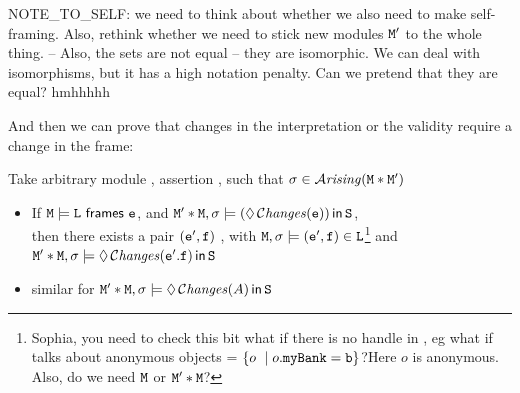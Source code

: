 NOTE\_TO\_SELF: we need to think about whether we also need to make  self-framing.
Also, rethink whether we need to stick new modules ${\mbox{\tt{M}}}'$ to the whole thing.
--
Also, the sets are not equal -- they are isomorphic. We can deal with isomorphisms, but
it has a high notation penalty. Can we pretend that they are equal? hmhhhhh


And then we can prove that changes in the interpretation or the validity require a change in the frame:

\begin{lemma}
Take arbitrary module \M, assertion \A, such that  $\sigma\in{\mathcal{A}}\textrm{\textit{rising}}({{\mbox{\tt{M}}}*{\mbox{\tt{M}}}'})$

\begin{itemize}
\item
If  ${\mbox{\tt{M}}}  \models {\mbox{\tt{L}}} ~{\bf{\sf {frames}}}~ {\mbox{\tt{e}}}$, and
${\mbox{\tt{M}}}'*{\mbox{\tt{M}}}, \sigma \models (\lozenge\, \mathcal{C}\textrm{\textit{hanges}}({\mbox{\tt{e}}}))\,{\bf{\sf {in}}}\, {\mbox{\tt{S}}}$, \\
then there exists a pair $({\mbox{\tt{e}}}',{\mbox{\tt{f}}})$ , with
${\mbox{\tt{M}}},\sigma \models ({\mbox{\tt{e}}}',{\mbox{\tt{f}}})\in {\mbox{\tt{L}}}$\footnote{Sophia, you need to check this bit  what if 
there is no handle in , eg what if  talks about anonymous objects
\eg {} = $\{ o \ \mid o.{\mbox{\tt{myBank}}}={\mbox{\tt{b}}} \}$?Here $o$ is anonymous. Also, do we need ${\mbox{\tt{M}}}$ or ${\mbox{\tt{M}}}'*{\mbox{\tt{M}}}$?}
and ${\mbox{\tt{M}}}'*{\mbox{\tt{M}}}, \sigma \models  \lozenge\, \mathcal{C}\textrm{\textit{hanges}}({\mbox{\tt{e}}}'.{\mbox{\tt{f}}})\,{\bf{\sf {in}}}\, {\mbox{\tt{S}}}$

\item
similar for
${\mbox{\tt{M}}}'*{\mbox{\tt{M}}}, \sigma \models \lozenge\, \mathcal{C}\textrm{\textit{hanges}}(A)\,{\bf{\sf {in}}}\, {\mbox{\tt{S}}}$
\end{itemize}

\end{lemma}

